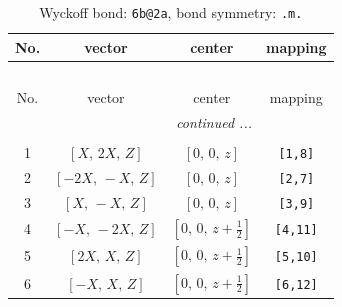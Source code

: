 \documentclass[fleqn,8pt]{jsarticle}
\begin{document}
\begin{longtable}{cccc}
\caption{Wyckoff bond: {\tt 6b@2a}, bond symmetry: {\tt .m.}}
 \\
 \hline \hline
No. & vector & center & mapping \\ \hline \endfirsthead

\multicolumn{3}{l}{\tablename\ \thetable{}} \\
 \hline \hline
No. & vector & center & mapping \\ \hline \endhead

 \hline \hline
\multicolumn{3}{r}{\footnotesize\it continued ...} \\ \endfoot

 \hline \hline
\multicolumn{3}{r}{} \\ \endlastfoot

1 & $\left[ X,\, 2 X,\, Z \right]$ & $\left[ 0,\, 0,\, z \right]$ & {\tt [1,8]} \\ \hline
2 & $\left[ - 2 X,\, - X,\, Z \right]$ & $\left[ 0,\, 0,\, z \right]$ & {\tt [2,7]} \\ \hline
3 & $\left[ X,\, - X,\, Z \right]$ & $\left[ 0,\, 0,\, z \right]$ & {\tt [3,9]} \\ \hline
4 & $\left[ - X,\, - 2 X,\, Z \right]$ & $\left[ 0,\, 0,\, z + \frac{1}{2} \right]$ & {\tt [4,11]} \\ \hline
5 & $\left[ 2 X,\, X,\, Z \right]$ & $\left[ 0,\, 0,\, z + \frac{1}{2} \right]$ & {\tt [5,10]} \\ \hline
6 & $\left[ - X,\, X,\, Z \right]$ & $\left[ 0,\, 0,\, z + \frac{1}{2} \right]$ & {\tt [6,12]} \\
\end{longtable}
\renewcommand{\arraystretch}{1.2}
\end{document}
